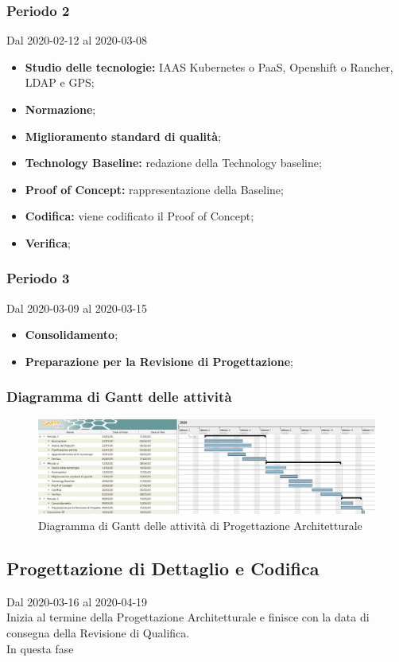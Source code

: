 \subsubsection{Periodo 2} 
Dal 2020-02-12 al 2020-03-08
\begin{itemize}
	\item \textbf{Studio delle tecnologie:} IAAS Kubernetes o PaaS, Openshift o Rancher, LDAP e GPS;
	\item \textbf{Normazione};
	\item \textbf{Miglioramento standard di qualità};
	\item \textbf{Technology Baseline:} redazione della Technology baseline;
	\item \textbf{Proof of Concept:} rappresentazione della Baseline;
	\item \textbf{Codifica:} viene codificato il Proof of Concept;
	\item \textbf{Verifica};
\end{itemize}
\subsubsection{Periodo 3} 
Dal 2020-03-09 al 2020-03-15
\begin{itemize}
	\item \textbf{Consolidamento};
	\item \textbf{Preparazione per la Revisione di Progettazione};
\end{itemize}
\subsubsection{Diagramma di Gantt delle attività}
\begin{figure}[h]
	\includegraphics[scale=1.1]{sezioni/DiagrammiGantt/ProgettazioneArchitetturale.png}
	\caption{Diagramma di Gantt delle attività di Progettazione Architetturale}
\end{figure}

\subsection{Progettazione di Dettaglio e Codifica}
Dal 2020-03-16 al 2020-04-19\\
Inizia al termine della Progettazione Architetturale e finisce con la data di consegna della Revisione di Qualifica.\\
In questa fase 



